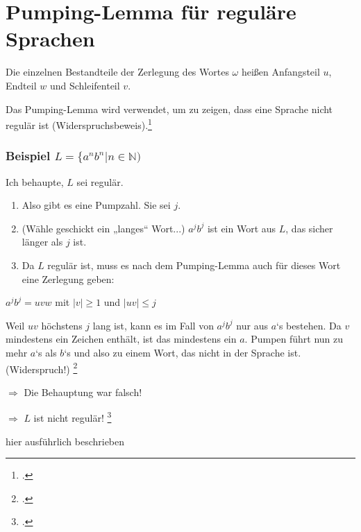 \documentclass{bschlangaul-theorie}
\begin{document}
\chapter{Pumping-Lemma für reguläre Sprachen}

\noindent
\liPumpingRegulaer

Die einzelnen Bestandteile der Zerlegung des Wortes $\omega$ heißen
Anfangsteil $u$, Endteil $w$ und Schleifenteil $v$.%

\noindent
Das Pumping-Lemma wird verwendet, um zu zeigen, dass eine
Sprache nicht regulär ist (Widerspruchsbeweis).\footcite[Seite 63]{theo:fs:1}

%

\subsection{Beispiel $L = \{a^n b^n | n \in \mathbb{N})$}

Ich behaupte, $L$ sei regulär.

\begin{enumerate}
\item Also gibt es eine Pumpzahl. Sie sei $j$.

\item (Wähle geschickt ein „langes“ Wort...)
$a^j b^j$ ist ein Wort aus $L$, das sicher länger als $j$ ist.

\item Da $L$ regulär ist, muss es nach dem Pumping-Lemma auch für dieses
Wort eine Zerlegung geben:
\end{enumerate}

\begin{center}
$a^j b^j = uvw$ mit $|v| \geq 1$ und $|uv| \leq j$
\end{center}

\noindent
Weil $uv$ höchstens $j$ lang ist, kann es im Fall von $a^j b^j$ nur aus
$a$‘s bestehen. Da $v$ mindestens ein Zeichen enthält, ist das
mindestens ein $a$. Pumpen führt nun zu mehr $a$‘s als $b$‘s und also zu
einem Wort, das nicht in der Sprache ist. (Widerspruch!)
\footcite{wiki:pumping}

$\Rightarrow$ Die Behauptung war falsch!

$\Rightarrow$ $L$ ist nicht regulär!
\footcite[Seite 63-64]{theo:fs:1}

hier ausführlich beschrieben 

\literatur
\end{document}
